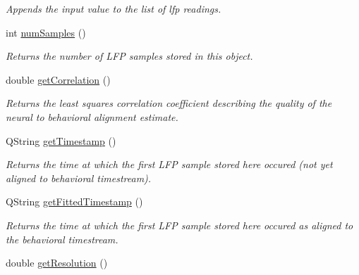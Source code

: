 \begin{DoxyCompactItemize}
\begin{DoxyCompactList}\small\item\em Appends the input value to the list of lfp readings. \end{DoxyCompactList}\item 
\hypertarget{class_picto_1_1_l_f_p_data_unit_package_a682bf39fd107ae51faaa9584374295b6}{int \hyperlink{class_picto_1_1_l_f_p_data_unit_package_a682bf39fd107ae51faaa9584374295b6}{num\-Samples} ()}\label{class_picto_1_1_l_f_p_data_unit_package_a682bf39fd107ae51faaa9584374295b6}

\begin{DoxyCompactList}\small\item\em Returns the number of L\-F\-P samples stored in this object. \end{DoxyCompactList}\item 
\hypertarget{class_picto_1_1_l_f_p_data_unit_package_a337bc256a937917ea0bfe4c1f92356b3}{double \hyperlink{class_picto_1_1_l_f_p_data_unit_package_a337bc256a937917ea0bfe4c1f92356b3}{get\-Correlation} ()}\label{class_picto_1_1_l_f_p_data_unit_package_a337bc256a937917ea0bfe4c1f92356b3}

\begin{DoxyCompactList}\small\item\em Returns the least squares correlation coefficient describing the quality of the neural to behavioral alignment estimate. \end{DoxyCompactList}\item 
\hypertarget{class_picto_1_1_l_f_p_data_unit_package_a6699462f35f5b23f5690db3a1b84f596}{Q\-String \hyperlink{class_picto_1_1_l_f_p_data_unit_package_a6699462f35f5b23f5690db3a1b84f596}{get\-Timestamp} ()}\label{class_picto_1_1_l_f_p_data_unit_package_a6699462f35f5b23f5690db3a1b84f596}

\begin{DoxyCompactList}\small\item\em Returns the time at which the first L\-F\-P sample stored here occured (not yet aligned to behavioral timestream). \end{DoxyCompactList}\item 
\hypertarget{class_picto_1_1_l_f_p_data_unit_package_a0a011b52d549e94a1c4222f5eba0682d}{Q\-String \hyperlink{class_picto_1_1_l_f_p_data_unit_package_a0a011b52d549e94a1c4222f5eba0682d}{get\-Fitted\-Timestamp} ()}\label{class_picto_1_1_l_f_p_data_unit_package_a0a011b52d549e94a1c4222f5eba0682d}

\begin{DoxyCompactList}\small\item\em Returns the time at which the first L\-F\-P sample stored here occured as aligned to the behavioral timestream. \end{DoxyCompactList}\item 
\hypertarget{class_picto_1_1_l_f_p_data_unit_package_ab4ee1884672291f7f4cfd76a2925a9e8}{double \hyperlink{class_picto_1_1_l_f_p_data_unit_package_ab4ee1884672291f7f4cfd76a2925a9e8}{get\-Resolution} ()}\label{class_picto_1_1_l_f_p_data_unit_package_ab4ee1884672291f7f4cfd76a2925a9e8}


\end{DoxyCompactItemize}
